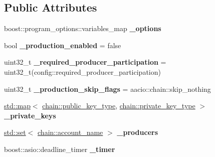 \subsection*{Public Attributes}
\begin{DoxyCompactItemize}
\item 
\mbox{\label{classaacio_1_1producer__plugin__impl_a232b1f3747767551d4819a09e8b3884f}} 
boost\+::program\+\_\+options\+::variables\+\_\+map {\bfseries \+\_\+options}
\item 
\mbox{\label{classaacio_1_1producer__plugin__impl_a19f4804cecef6bd6eba939d583ed782f}} 
bool {\bfseries \+\_\+production\+\_\+enabled} = false
\item 
\mbox{\label{classaacio_1_1producer__plugin__impl_a3ec6d3b1c356afa260c39e220ec0a508}} 
uint32\+\_\+t {\bfseries \+\_\+required\+\_\+producer\+\_\+participation} = uint32\+\_\+t(config\+::required\+\_\+producer\+\_\+participation)
\item 
\mbox{\label{classaacio_1_1producer__plugin__impl_a3ce5f117a27ae80cb13f8936703441b8}} 
uint32\+\_\+t {\bfseries \+\_\+production\+\_\+skip\+\_\+flags} = aacio\+::chain\+::skip\+\_\+nothing
\item 
\mbox{\label{classaacio_1_1producer__plugin__impl_a6247ac32459fafff72a739aa04b76aaa}} 
\mbox{\hyperlink{classstd_1_1map}{std\+::map}}$<$ \mbox{\hyperlink{classfc_1_1crypto_1_1public__key}{chain\+::public\+\_\+key\+\_\+type}}, \mbox{\hyperlink{classfc_1_1crypto_1_1private__key}{chain\+::private\+\_\+key\+\_\+type}} $>$ {\bfseries \+\_\+private\+\_\+keys}
\item 
\mbox{\label{classaacio_1_1producer__plugin__impl_a8409c819ae6328cd23e05849616b7183}} 
\mbox{\hyperlink{classstd_1_1set}{std\+::set}}$<$ \mbox{\hyperlink{structaacio_1_1chain_1_1name}{chain\+::account\+\_\+name}} $>$ {\bfseries \+\_\+producers}
\item 
\mbox{\label{classaacio_1_1producer__plugin__impl_a3476b946f6c436231e341dfa5b214c4a}} 
boost\+::asio\+::deadline\+\_\+timer {\bfseries \+\_\+timer}

\end{DoxyCompactItemize}
